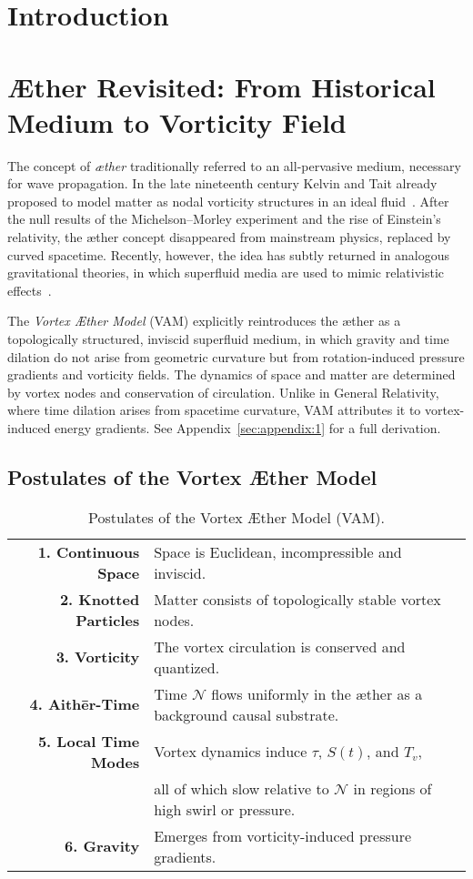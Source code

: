 \section*{Introduction}
\section*{Æther Revisited: From Historical Medium to Vorticity Field}

The concept of \textit{æther} traditionally referred to an all-pervasive medium, necessary for wave propagation. In the late nineteenth century Kelvin and Tait already proposed to model matter as nodal vorticity structures in an ideal fluid~\cite{thomson1867treatise}. After the null results of the Michelson--Morley experiment and the rise of Einstein's relativity, the æther concept disappeared from mainstream physics, replaced by curved spacetime. Recently, however, the idea has subtly returned in analogous gravitational theories, in which superfluid media are used to mimic relativistic effects~\cite{barcelo2011analogue,volovik2009universe}.

The \textit{Vortex Æther Model} (VAM) explicitly reintroduces the æther as a topologically structured, inviscid superfluid medium, in which gravity and time dilation do not arise from geometric curvature but from rotation-induced pressure gradients and vorticity fields. The dynamics of space and matter are determined by vortex nodes and conservation of circulation. Unlike in General Relativity, where time dilation arises from spacetime curvature, VAM attributes it to vortex-induced energy gradients. See Appendix~\ref{sec:appendix:1} for a full derivation.


\subsection*{Postulates of the Vortex Æther Model}

\begin{table}[h!]
    \centering
    \begin{tabular}{rl}
        \midrule
        \hline
        \textbf{1. Continuous Space} & Space is Euclidean, incompressible and inviscid. \\
        \textbf{2. Knotted Particles} & Matter consists of topologically stable vortex nodes. \\
        \textbf{3. Vorticity} & The vortex circulation is conserved and quantized. \\
        \textbf{4. Aithēr-Time} & Time $\mathcal{N}$ flows uniformly in the æther as a background causal substrate. \\
        \textbf{5. Local Time Modes} & Vortex dynamics induce $\tau$, $S(t)$, and $T_v$,\\ & all of which slow relative to $\mathcal{N}$ in regions of high swirl or pressure. \\
        \textbf{6. Gravity} & Emerges from vorticity-induced pressure gradients. \\
        \hline
        \bottomrule
    \end{tabular}
    \caption{Postulates of the Vortex Æther Model (VAM).}
    \label{tab:postulates}
\end{table}

